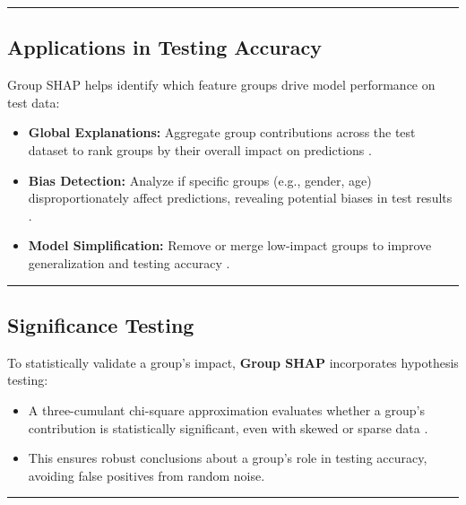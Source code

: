 \documentclass[11pt]{article}
\theoremstyle{remark}
\begin{document}
\bigskip
\hrule
\bigskip

\subsection{Applications in Testing Accuracy}
Group SHAP helps identify which feature groups drive model performance on test data:
\begin{itemize}
  \item \textbf{Global Explanations:}
    Aggregate group contributions across the test dataset to rank groups by their overall impact on predictions \cite{lundberg2017unified, jullum2021groupShapley}.
  \item \textbf{Bias Detection:}
    Analyze if specific groups (e.g., gender, age) disproportionately affect predictions, revealing potential biases in test results \cite{molnar2021interpretable, jullum2021groupShapley}.
  \item \textbf{Model Simplification:}
    Remove or merge low-impact groups to improve generalization and testing accuracy \cite{molnar2021interpretable, jullum2021groupShapley}.
\end{itemize}

\bigskip
\hrule
\bigskip

\subsection{Significance Testing}
To statistically validate a group's impact, \textbf{Group SHAP} incorporates hypothesis testing:
\begin{itemize}
  \item A three-cumulant chi-square approximation evaluates whether a group's contribution is statistically significant, even with skewed or sparse data \cite{jullum2021groupShapley}.
  \item This ensures robust conclusions about a group's role in testing accuracy, avoiding false positives from random noise.
\end{itemize}

\bigskip
\hrule
\bigskip
\end{document}
